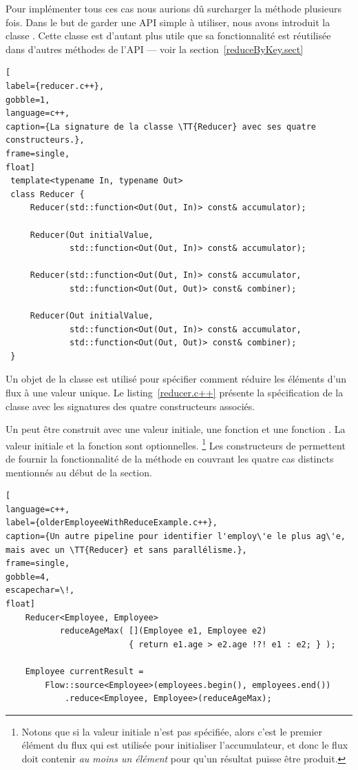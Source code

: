 Pour impl\'ementer tous ces cas nous aurions d\^u surcharger la m\'ethode   plusieurs fois. Dans le but de garder une API simple \`a utiliser, nous avons introduit la classe  . Cette classe est d'autant plus utile que sa fonctionnalit\'e est r\'eutilis\'ee dans d'autres m\'ethodes de l'API --- voir la section~\ref{reduceByKey.sect}


\begin{lstlisting}[
label={reducer.c++},
gobble=1,
language=c++,
caption={La signature de la classe \TT{Reducer} avec ses quatre constructeurs.},
frame=single,
float]
 template<typename In, typename Out>
 class Reducer {
     Reducer(std::function<Out(Out, In)> const& accumulator);

     Reducer(Out initialValue, 
             std::function<Out(Out, In)> const& accumulator);
                	   
     Reducer(std::function<Out(Out, In)> const& accumulator,
             std::function<Out(Out, Out)> const& combiner);
                               	   
     Reducer(Out initialValue, 
             std::function<Out(Out, In)> const& accumulator,
             std::function<Out(Out, Out)> const& combiner);               
 }
\end{lstlisting}


Un objet de la classe  est utilis\'e pour sp\'ecifier comment r\'eduire les \'el\'ements d'un flux \`a une valeur unique. Le listing~\ref{reducer.c++} présente la spécification  de la classe  avec les signatures des quatre constructeurs associ\'es. 

Un  peut être construit avec une valeur initiale, une fonction  et une fonction . La valeur initiale et la fonction  sont optionnelles.%
%
\footnote{Notons que si la valeur initiale n'est pas spécifiée, alors
c'est le premier élément du flux qui est utilisée pour initialiser
l'accumulateur, et donc le flux doit contenir \emph{au moins un élément} pour
qu'un résultat puisse être produit.}
%
Les constructeurs de  permettent de fournir la fonctionnalit\'e de la m\'ethode  en couvrant les quatre cas distincts mentionn\'es au d\'ebut de la section.
%


\begin{lstlisting}[
language=c++,
label={olderEmployeeWithReduceExample.c++},
caption={Un autre pipeline pour identifier l'employ\'e le plus ag\'e, mais avec un \TT{Reducer} et sans parallélisme.},
frame=single,
gobble=4,
escapechar=\!,
float]
    Reducer<Employee, Employee> 
           reduceAgeMax( [](Employee e1, Employee e2) 
                         { return e1.age > e2.age !?! e1 : e2; } );

    Employee currentResult =
        Flow::source<Employee>(employees.begin(), employees.end())
            .reduce<Employee, Employee>(reduceAgeMax);
\end{lstlisting}


